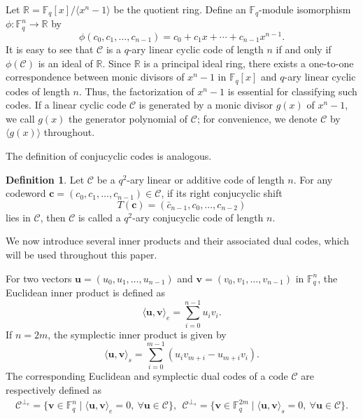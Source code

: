 \documentclass{aims}
\numberwithin{equation}{section}
\theoremstyle{definition}
\newtheorem{definition}[theorem]{Definition}
\newcommand{\F}{\mathbb{F}}
\newcommand{\R}{\mathbb{R}}
\begin{document}
Let $\R = \F_q[x] / \langle x^n - 1 \rangle$ be the quotient ring. Define an $\F_q$-module isomorphism $\phi: \F_q^n \to \R$ by
\[
\phi(c_0, c_1, \ldots, c_{n-1}) = c_0 + c_1 x + \cdots + c_{n-1} x^{n-1}.
\]
It is easy to see that $\mathcal{C}$ is a $q$-ary linear cyclic code of length $n$ if and only if $\phi(\mathcal{C})$ is an ideal of $\R$. Since $\R$ is a principal ideal ring, there exists a one-to-one correspondence between monic divisors of $x^n - 1$ in $\F_q[x]$ and $q$-ary linear cyclic codes of length $n$. Thus, the factorization of $x^n - 1$ is essential for classifying such codes. If a linear cyclic code $\mathcal{C}$ is generated by a monic divisor $g(x)$ of $x^n - 1$, we call $g(x)$ the generator polynomial of $\mathcal{C}$; for convenience, we denote $\mathcal{C}$ by $\langle g(x) \rangle$ throughout.

The definition of conjucyclic codes is analogous.

\begin{definition}\label{def:conjucyclic}
	Let $\mathcal{C}$ be a $q^2$-ary linear or additive code of length $n$. For any codeword $\pmb{c} = (c_0, c_1, \ldots, c_{n-1}) \in \mathcal{C}$, if its right conjucyclic shift 
	\begin{equation}\label{eq222xx}
		T(\pmb{c}) = (\bar{c}_{n-1}, c_0, \ldots, c_{n-2})
	\end{equation}
	lies in $\mathcal{C}$, then $\mathcal{C}$ is called a $q^2$-ary conjucyclic code of length $n$.
\end{definition}

We now introduce several inner products and their associated dual codes, which will be used throughout this paper.

For two vectors $\pmb{u} = (u_0, u_1, \ldots, u_{n-1})$ and $\pmb{v} = (v_0, v_1, \ldots, v_{n-1})$ in $\F_q^n$, the Euclidean inner product is defined as
\[
\langle \pmb{u}, \pmb{v} \rangle_e = \sum_{i=0}^{n-1} u_i v_i.
\]
If $n = 2m$, the symplectic inner product is given by
\begin{equation}\label{wewe12}
\langle \pmb{u}, \pmb{v} \rangle_s = \sum_{i=0}^{m-1} (u_i v_{m+i} - u_{m+i} v_i).
\end{equation}
The corresponding Euclidean and symplectic dual codes of a code $\mathcal{C}$ are respectively defined as
\begin{equation*}
\begin{split}
\mathcal{C}^{\perp_e} = \{ \pmb{v} \in \F_q^n \mid \langle \pmb{u}, \pmb{v} \rangle_e = 0,\ \forall \pmb{u} \in \mathcal{C} \},~~
\mathcal{C}^{\perp_s} = \{ \pmb{v} \in \F_q^{2m} \mid \langle \pmb{u}, \pmb{v} \rangle_s = 0,\ \forall \pmb{u} \in \mathcal{C} \}.
\end{split}
\end{equation*}
	
\end{document}
